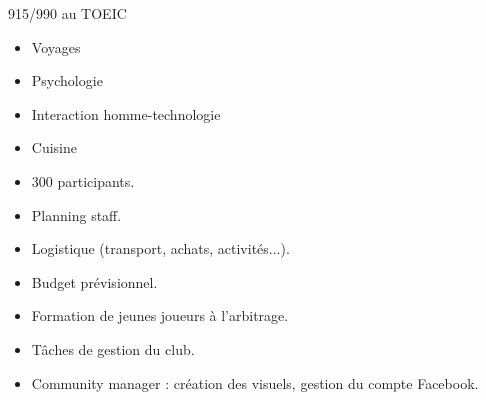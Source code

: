 915/990 au TOEIC

\sidedivider




\sidedivider



\begin{itemize}
    \item Voyages
    \item Psychologie
    \item Interaction homme-technologie
    \item Cuisine
\end{itemize}


\begin{itemize}
    \item 300 participants.
    \item Planning staff.
    \item Logistique (transport, achats, activités...).
    \item Budget prévisionnel.
\end{itemize}
\sidedivider

\begin{itemize}
    \item Formation de jeunes joueurs à l'arbitrage.
    \item Tâches de gestion du club.
    \item Community manager : création des visuels, gestion du compte Facebook.
\end{itemize}


